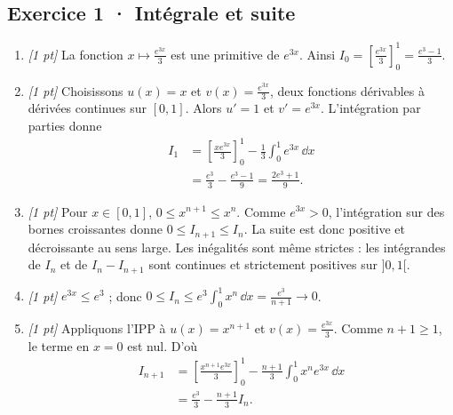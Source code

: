 \subsection*{Exercice 1 · Intégrale et suite}\begin{enumerate}

\item \textit{[1 pt]} La fonction $x\mapsto \frac{e^{3x}}{3}$ est une primitive de $e^{3x}$. Ainsi $I_0=[\frac{e^{3x}}{3}]_0^1=\frac{e^{3}-1}{3}$.

\item \textit{[1 pt]} Choisissons $u(x)=x$ et $v(x)=\frac{e^{3x}}{3}$, deux fonctions dérivables à dérivées continues sur $[0,1]$. Alors $u'=1$ et $v'=e^{3x}$. L'intégration par parties donne
\[\begin{aligned}I_1&=\left[\frac{xe^{3x}}{3}\right]_0^1-\frac{1}{3}\int_0^1e^{3x}\,\dd x\\&=\frac{e^{3}}{3}-\frac{e^{3}-1}{9}=\frac{2e^{3}+1}{9}.\end{aligned}\]

\item \textit{[1 pt]} Pour $x\in[0,1]$, $0\le x^{n+1}\le x^n$. Comme $e^{3x}>0$, l'intégration sur des bornes croissantes donne $0\le I_{n+1}\le I_n$. La suite est donc positive et décroissante au sens large. Les inégalités sont même strictes : les intégrandes de $I_n$ et de $I_n-I_{n+1}$ sont continues et strictement positives sur $]0,1[$.

\item \textit{[1 pt]} $e^{3x}\le e^{3}$ ; donc $0\le I_n\le e^{3}\int_0^1x^n\,\dd x=\frac{e^{3}}{n+1}\to0$.

\item \textit{[1 pt]} Appliquons l'IPP à $u(x)=x^{n+1}$ et $v(x)=\frac{e^{3x}}{3}$. Comme $n+1\ge1$, le terme en $x=0$ est nul. D'où
\[\begin{aligned}I_{n+1}&=\left[\frac{x^{n+1}e^{3x}}{3}\right]_0^1-\frac{n+1}{3}\int_0^1x^ne^{3x}\,\dd x\\&=\frac{e^{3}}{3}-\frac{n+1}{3}I_n.\end{aligned}\]

\end{enumerate}

